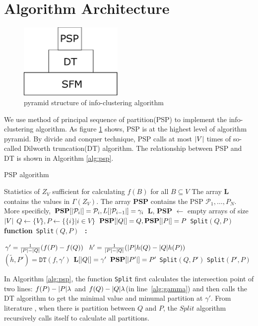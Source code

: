 \documentclass{article}
\makeatletter
\def\P{\mathcal{P}}
\DeclarePairedDelimiter\abs{\lvert}{\rvert}
\newcommand{\algorithmicfunction}{\textbf{function}}
\newcommand{\algorithmicendfunction}{\algorithmicend\ \algorithmicfunction}
\newenvironment{ALC@func}{\begin{ALC@g}}{\end{ALC@g}}
\newcommand{\FUNCTION}[2][default]{\ALC@it\algorithmicfunction\ #2\ %
\textbf{:}%
\ALC@com{#1}\begin{ALC@func}}
\newcommand{\ENDFUNCTION}{\end{ALC@func}}
\newcommand{\ENDFUNCTION}{\end{ALC@func}\ALC@it\algorithmicendfunction}
\theoremstyle{definition}
\makeatother
\begin{document}
\section{Algorithm Architecture}
\begin{figure}[!ht]
\centering
\includegraphics[width=5cm]{pic/pyramid.eps}
\caption{pyramid structure of info-clustering algorithm}\label{fig:ps}
\end{figure}
We use method of principal sequence of partition(PSP) to implement the info-clustering algorithm. As figure \ref{fig:ps} shows, PSP is at the highest level of algorithm pyramid. By divide and conquer technique, PSP calls at most $\abs{V}$ times of so-called Dilworth truncation(DT) algorithm. The relationship between PSP and DT is shown in Algorithm \ref{alg:psp}.
\begin{algorithm}
\caption{PSP algorithm}\label{alg:psp}
\begin{algorithmic}[1]
\REQUIRE Statistics of $Z_V$ sufficient for calculating $f(B)$ for all $B \subseteq V$
\ENSURE The array \textbf{L} contains the values in $\Gamma(Z_V)$. The array \textbf{PSP} contains the PSP $\P_1,\dots, P_N$. More specificly, $\textbf{PSP}[\abs{\P_i}]=\P_i, L[\abs{\P_{i-1}}]=\gamma_i$
\STATE \textbf{L}, \textbf{PSP} $\leftarrow$ empty arrays of size $\abs{V}$
\STATE $Q\leftarrow \{V\}, P \leftarrow \{ \{i \} | i \in V\}$
\STATE $\mathbf{PSP}[\abs{Q}]=Q, \mathbf{PSP}[\abs{P}] = P$
\STATE \texttt{Split}$(Q,P)$
\FUNCTION{\texttt{Split}$(Q,P)$}
 \STATE\label{alg:gamma} $\gamma' = {1 \over \abs{P} - \abs{Q}} (f(P)-f(Q))$
 \STATE $h' = {1 \over \abs{P} - \abs{Q}}(\abs{P} h(Q) - \abs{Q} h(P))$
 \STATE $(\tilde{h}, P') = \texttt{DT}(f,\gamma')$
 	\STATE $\mathbf{L}[\abs{Q}] = \gamma'$
 \ELSE
 	\STATE $\mathbf{PSP}[\abs{P'}]=P'$
 	\STATE \texttt{Split}$(Q,P')$
 	\STATE \texttt{Split}$(P',P)$
 \ENDIF
\ENDFUNCTION
\end{algorithmic}
\end{algorithm}

In Algorithm \ref{alg:psp}, the function \texttt{Split} first calculates the intersection point of two lines: $f(P)-\abs{P}\lambda$ and $f(Q)-\abs{Q}\lambda$(in line~\ref{alg:gamma}) and then calls the DT algorithm to get the minimal value and minumal partition at $\gamma'$. From literature \cite{mac}, when there is partition between $Q$ and $P$, the $Split$ algorithm recursively calls itself to calculate all partitions.
\end{document}
